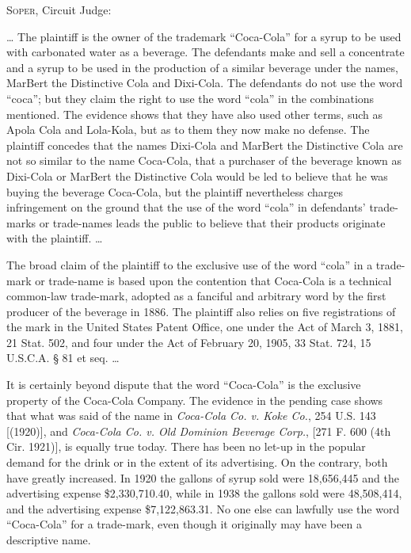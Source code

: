 
\opinion \textsc{Soper}, Circuit Judge:

\ldots
The plaintiff is the owner of the trademark ``Coca-Cola'' for a syrup to be used
with carbonated water as a beverage. The defendants make and sell a concentrate
and a syrup to be used in the production of a similar beverage under the names,
MarBert the Distinctive Cola and Dixi-Cola. The defendants do not use the word
``coca''; but they claim the right to use the word ``cola'' in the combinations
mentioned. The evidence shows that they have also used other terms, such as
Apola Cola and Lola-Kola, but as to them they now make no defense. The
plaintiff concedes that the names Dixi-Cola and MarBert the Distinctive Cola
are not so similar to the name Coca-Cola, that a purchaser of the beverage
known as Dixi-Cola or MarBert the Distinctive Cola would be led to believe that
he was buying the beverage Coca-Cola, but the plaintiff nevertheless charges
infringement on the ground that the use of the word ``cola'' in defendants'
trade-marks or trade-names leads the public to believe that their products
originate with the plaintiff. {\dots}

The broad claim of the plaintiff to the exclusive use of the word ``cola'' in a
trade-mark or trade-name is based upon the contention that Coca-Cola is a
technical common-law trade-mark, adopted as a fanciful and arbitrary word by
the first producer of the beverage in 1886. The plaintiff also relies on five
registrations of the mark in the United States Patent Office, one under the Act
of March 3, 1881, 21 Stat. 502, and four under the Act of February 20, 1905, 33
Stat. 724, 15 U.S.C.A. {\S} 81 et seq. {\dots}

It is certainly beyond dispute that the word ``Coca-Cola'' is the exclusive
property of the Coca-Cola Company. The evidence in the pending case shows that
what was said of the name in \textit{Coca-Cola Co. v. Koke Co.}, 254 U.S. 143
[(1920)], and \textit{Coca-Cola Co. v. Old Dominion Beverage Corp.}, [271 F.
600 (4th Cir. 1921)], is equally true today. There has been no let-up in the
popular demand for the drink or in the extent of its advertising. On the
contrary, both have greatly increased. In 1920 the gallons of syrup sold were
18,656,445 and the advertising expense \$2,330,710.40, while in 1938 the
gallons sold were 48,508,414, and the advertising expense \$7,122,863.31. No
one else can lawfully use the word ``Coca-Cola'' for a trade-mark, even though
it originally may have been a descriptive name.

